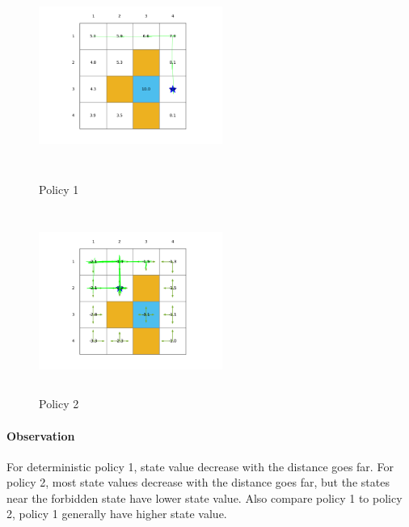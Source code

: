 \documentclass[UTF8]{ctexart}
\begin{document}
	\begin{figure}[H]
		\centering
		\begin{minipage}[t]{0.48\textwidth}
			\centering
			\includegraphics[width=6cm,height=6cm]{fig/policy1_interative}
			\caption{Policy 1}
		\end{minipage}
		\begin{minipage}[t]{0.48\textwidth}
			\centering
			\includegraphics[width=6cm,height=6cm]{fig/policy2_interative}
			\caption{Policy 2}
		\end{minipage}
	\end{figure}
	\paragraph{Observation} For deterministic policy 1, state value decrease with the distance goes far. For policy 2, most state values decrease with the distance goes far, but the states near the forbidden state have lower state value. Also compare policy 1 to policy 2, policy 1 generally have higher state value.
\end{document}
